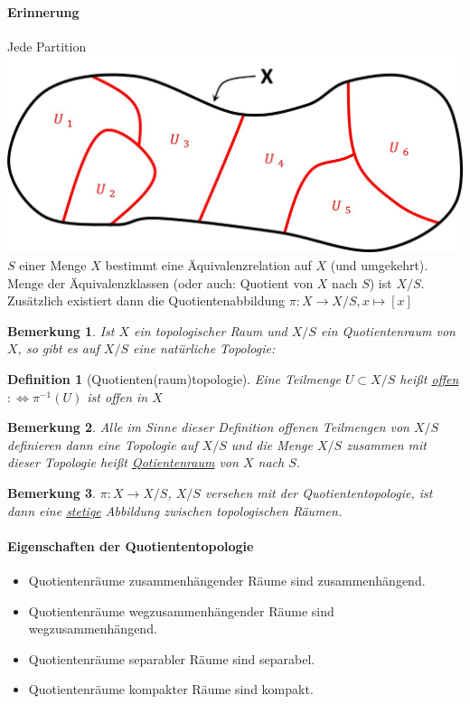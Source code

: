 \documentclass[a4paper,11pt,notitlepage]{report}
\newtheorem{definition}{Definition}[chapter]
\newtheorem{remark}{Bemerkung}[chapter]
\begin{document}
\paragraph{Erinnerung} Jede Partition \includegraphics[scale=0.2]{images/Partition.jpg} $S$ einer Menge $X$ bestimmt eine Äquivalenzrelation auf $X$ (und umgekehrt).
\newline
Menge der Äquivalenzklassen (oder auch: Quotient von $X$ nach $S$) ist $X/S$.
Zusätzlich existiert dann die Quotientenabbildung $\pi \colon X \rightarrow X/S, x \mapsto [x]$ 

\begin{remark}
	Ist $X$ ein topologischer Raum und $X/S$ ein Quotientenraum von $X$, so gibt es auf $X/S$ eine natürliche Topologie:
\end{remark}

\begin{definition}[Quotienten(raum)topologie]
	Eine Teilmenge $U \subset X/S$ heißt \underline{offen}
	$:\Leftrightarrow \pi^{-1}(U)$ ist offen in $X$
\end{definition}
 
\begin{remark}
	Alle im Sinne dieser Definition offenen Teilmengen von $X/S$ definieren dann eine Topologie auf $X/S$ und die Menge $X/S$ zusammen mit dieser Topologie heißt \underline{Qotienten\underline{raum}} von $X$ nach $S$.
\end{remark}

\begin{remark}
	$\pi \colon X \rightarrow X/S$, $X/S$ versehen mit der Quotiententopologie, ist dann eine  \underline{stetige} Abbildung zwischen topologischen Räumen.
\end{remark}

\paragraph{Eigenschaften der Quotiententopologie}
\begin{itemize}
	\item Quotientenräume zusammenhängender Räume sind zusammenhängend.
	\item Quotientenräume wegzusammenhängender Räume sind wegzusammenhängend.
	\item Quotientenräume separabler Räume sind separabel.
	\item Quotientenräume kompakter Räume sind kompakt.
\end{itemize}
\end{document}
